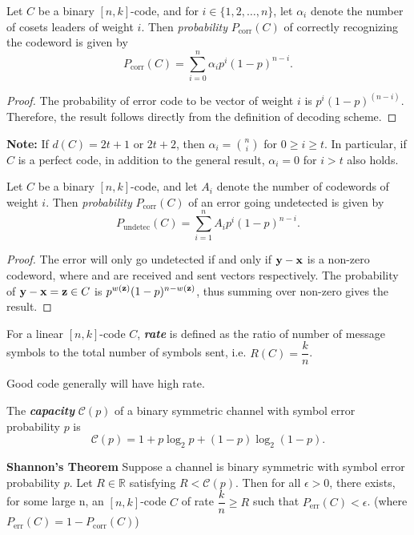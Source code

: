 \documentclass[../main.tex]{subfiles}
\begin{document}
\begin{thm}
	Let $C$ be a binary $[n,k]$-code, and for $i\in \{1,2,\ldots,n\}$, let $\alpha_i$ denote the number of cosets leaders of weight $i$. Then \emph{probability} $P_{\text{corr}}(C)$ of correctly recognizing the codeword is given by
	\[
		P_{\text{corr}}(C) = \displaystyle\sum_{i=0}^{n}\alpha_ip^i(1-p)^{n-i}.
	\]
\end{thm}
\begin{proof}
	The probability of error code to be vector of weight $i$ is $p^i(1-p)^(n-i)$. Therefore, the result follows directly from the definition of decoding scheme.
\end{proof}
\textbf{Note:} If $d(C)=2t+1$ or $2t+2$, then $\alpha_i=\binom{n}{i}$ for $0\geq i\geq t$. In particular, if $C$ is a perfect code, in addition to the general result, $\alpha_i=0$ for $i>t$ also holds.

\begin{thm}
	Let $C$ be a binary $[n,k]$-code, and let $A_i$ denote the number of codewords of weight $i$. Then \emph{probability} $P_{\text{corr}}(C)$ of an error going undetected is given by
	\[
		P_{\text{undetec}}(C) = \displaystyle\sum_{i=1}^{n}A_ip^i(1-p)^{n-i}.
	\]
\end{thm}
\begin{proof}
	The error will only go undetected if and only if $\textbf{y}-\textbf{x}$ is a non-zero codeword, where  and  are received and sent vectors respectively. The probability of $\textbf{y}-\textbf{x} = \textbf{z}\in C$ is $p^{w(\textbf{z})}(1-p)^{n-w(\textbf{z})}$, thus summing over non-zero  gives the result. 
\end{proof}

\begin{defn}
	For a linear $[n,k]$-code $C$, \textbf{\emph{rate}} is defined as the ratio of number of message symbols to the total number of symbols sent, i.e. $R(C)=\dfrac{k}{n}$.
\end{defn}
Good code generally will have high rate.
\begin{defn}
	The \textbf{\emph{capacity}} $\mathscr{C}(p)$ of a binary symmetric channel with symbol error probability $p$ is
	\[
		\mathscr{C}(p) = 1 + p\log_2p + (1-p)\log_2(1-p).
	\] 
\end{defn}

\begin{thm}{\textbf{Shannon's Theorem}}
	Suppose a channel is binary symmetric with symbol error probability $p$. Let $R\in \mathbb{R}$ satisfying $R<\mathscr{C}(p)$. Then for all $\epsilon > 0$, there exists, for some large n, an $[n,k]$-code $C$ of rate $\dfrac{k}{n} \geq R$ such that $P_{\text{err}}(C)<\epsilon$. (where $P_{\text{err}}(C) = 1-P_{\text{corr}}(C)$)
\end{thm}
\end{document}
